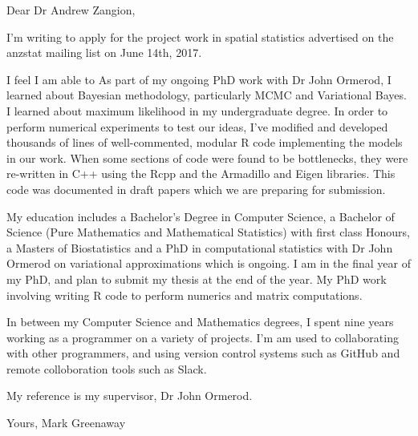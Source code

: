 \documentclass{letter}
\begin{document}
Dear Dr Andrew Zangion,

I'm writing to apply for the project work in spatial statistics advertised on the anzstat mailing list on
June 14th, 2017.

I feel I am able to 
As part of my ongoing PhD work with Dr John Ormerod, I learned about Bayesian methodology, particularly
MCMC and Variational Bayes. I learned about maximum likelihood in my undergraduate degree.
In order to perform numerical experiments to test our ideas, I've modified and developed thousands of lines
of well-commented, modular R code implementing the models in our work.
When some sections of code were found to be bottlenecks, they were re-written in
C++ using the Rcpp and the Armadillo and Eigen libraries.
This code was documented in draft papers which we are preparing for submission.

My education includes a Bachelor's Degree in Computer Science, a Bachelor of Science (Pure Mathematics and
Mathematical Statistics) with first class Honours, a Masters of Biostatistics and a PhD in computational statistics
with Dr John Ormerod on variational approximations which is ongoing. I am in the final year of my PhD,
and plan to submit my thesis at the end of the year. My PhD work involving writing R code to perform
numerics and matrix computations.

In between my Computer Science and Mathematics degrees, I spent nine years working as a programmer on
a variety of projects.
I'm am used to collaborating with other programmers, and using version control systems such as GitHub and
remote colloboration tools such as Slack.

My reference is my supervisor, Dr John Ormerod.

Yours,
Mark Greenaway
\end{document}

